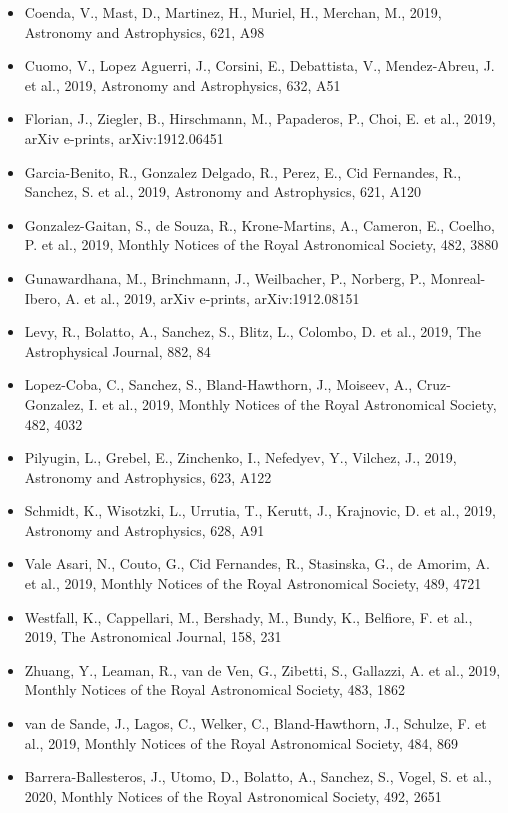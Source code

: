 \documentclass{letter}
\begin{document}
\begin{enumerate}
\begin{itemize}
\item Coenda, V., Mast, D., Martinez, H., Muriel, H., Merchan, M., 2019, Astronomy and Astrophysics, 621, A98
\item Cuomo, V., Lopez Aguerri, J., Corsini, E., Debattista, V., Mendez-Abreu, J. et al., 2019, Astronomy and Astrophysics, 632, A51
\item Florian, J., Ziegler, B., Hirschmann, M., Papaderos, P., Choi, E. et al., 2019, arXiv e-prints, arXiv:1912.06451
\item Garcia-Benito, R., Gonzalez Delgado, R., Perez, E., Cid Fernandes, R., Sanchez, S. et al., 2019, Astronomy and Astrophysics, 621, A120
\item Gonzalez-Gaitan, S., de Souza, R., Krone-Martins, A., Cameron, E., Coelho, P. et al., 2019, Monthly Notices of the Royal Astronomical Society, 482, 3880
\item Gunawardhana, M., Brinchmann, J., Weilbacher, P., Norberg, P., Monreal-Ibero, A. et al., 2019, arXiv e-prints, arXiv:1912.08151
\item Levy, R., Bolatto, A., Sanchez, S., Blitz, L., Colombo, D. et al., 2019, The Astrophysical Journal, 882, 84
\item Lopez-Coba, C., Sanchez, S., Bland-Hawthorn, J., Moiseev, A., Cruz-Gonzalez, I. et al., 2019, Monthly Notices of the Royal Astronomical Society, 482, 4032
\item Pilyugin, L., Grebel, E., Zinchenko, I., Nefedyev, Y., Vilchez, J., 2019, Astronomy and Astrophysics, 623, A122
\item Schmidt, K., Wisotzki, L., Urrutia, T., Kerutt, J., Krajnovic, D. et al., 2019, Astronomy and Astrophysics, 628, A91
\item Vale Asari, N., Couto, G., Cid Fernandes, R., Stasinska, G., de Amorim, A. et al., 2019, Monthly Notices of the Royal Astronomical Society, 489, 4721
\item Westfall, K., Cappellari, M., Bershady, M., Bundy, K., Belfiore, F. et al., 2019, The Astronomical Journal, 158, 231
\item Zhuang, Y., Leaman, R., van de Ven, G., Zibetti, S., Gallazzi, A. et al., 2019, Monthly Notices of the Royal Astronomical Society, 483, 1862
\item van de Sande, J., Lagos, C., Welker, C., Bland-Hawthorn, J., Schulze, F. et al., 2019, Monthly Notices of the Royal Astronomical Society, 484, 869
\item Barrera-Ballesteros, J., Utomo, D., Bolatto, A., Sanchez, S., Vogel, S. et al., 2020, Monthly Notices of the Royal Astronomical Society, 492, 2651

\end{itemize}
\end{enumerate}
\end{document}
